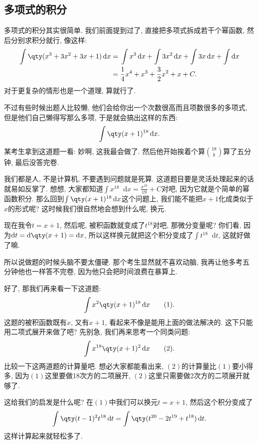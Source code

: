\documentclass{ctexbook}
\newcommand*{\dif}{\mathop{}\!\mathrm{d}}
\begin{document}
{\subsection{多项式的积分}
多项式的积分其实很简单. 我们前面提到过了, 直接把多项式拆成若干个幂函数, 然后分别求积分就行, 像这样: 
\begin{align*}
\int\qty(x^{3}+3x^{2}+3x+1)\dif{x}={}&\int x^{3}\dif{x}+\int3x^{2}\dif{x}+\int3x\dif{x}+\int\dif{x}\\
={}&\frac{1}{4}x^{4}+x^{3}+\frac{3}{2}x^{2}+x+C
.\end{align*}
对于更复杂的情形也是一个道理, 算就行了. \par
不过有些时候出题人比较懒, 他们会给你出一个次数很高而且项数很多的多项式, 但是他们自己懒得写那么多项, 于是就会搞出这样的东西: 
\begin{align*}
\int\qty(x+1)^{18}\dif{x}
.\end{align*}
某考生拿到这道题一看: 妙啊, 这我最会做了. 然后他开始挨着个算$\binom{18}{k}$算了五分钟, 最后没答完卷. \par
我们都是人, 不是计算机, 不要遇到问题就是死算. 这道题目要是灵活处理起来的话就易如反掌了. 想想, 大家都知道$\int x^{18}\dif{x}=\frac{x^{19}}{19}+C$对吧, 因为它就是个简单的幂函数积分. 那么回到$\int\qty(x+1)^{18}\dif{x}$这个问题上, 我们能不能把$x+1$化成类似于$x$的形式呢? 这时候我们很自然地会想到什么呢, 换元. \par
现在我令$t=x+1$, 然后呢, 被积函数就变成了$t^{18}$对吧, 那微分变量呢? 你们看, 因为$\dif{t}=\dif{\qty(x+1)}=\dif{x}$, 所以这样换元就把这个积分变成了$\int t^{18}\dif{t}$, 这就好做了嘛. \par
所以说做题的时候头脑不要太僵硬. 那个考生显然就不喜欢动脑, 我再让他多考五分钟他也一样答不完卷, 因为他只会把时间浪费在暴算上. \par
好了, 那我们再来看一下这道题: 
\begin{align*}
\int x^{2}\qty(x+1)^{18}\dif{x}\tag{1}
.\end{align*}
这题的被积函数既有$x$, 又有$x+1$, 看起来不像是能用上面的做法解决的. 这下只能用二项式展开来做了吧? 先别急, 我们再来思考一个同类问题: 
\begin{align*}
\int x^{18}\qty(x+1)^{2}\dif{x}\tag{2}
.\end{align*}
比较一下这两道题的计算量吧. 想必大家都能看出来, $(2)$的计算量比$(1)$要小得多, 因为$(1)$这里要做18次方的二项展开, $(2)$这里只需要做2次方的二项展开就够了. \par
这给我们的启发是什么呢? 在$(1)$中我们可以换元$t=x+1$, 然后这个积分变成了
\begin{align*}
\int\qty(t-1)^{2}t^{18}\dif{t}=\int\qty(t^{20}-2t^{19}+t^{18})\dif{t}
.\end{align*}
这样计算起来就轻松多了. \par
}
\end{document}
